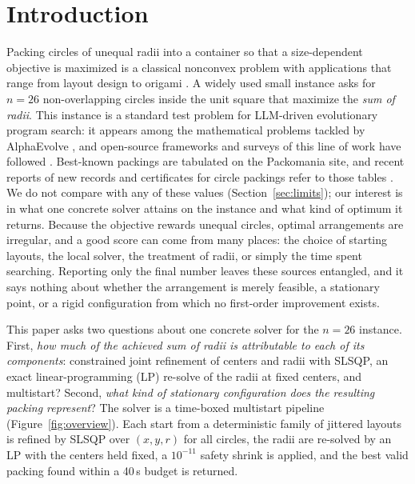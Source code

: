 \documentclass{article} %
\begin{document}
\section{Introduction}
Packing circles of unequal radii into a container so that a size-dependent objective is maximized is a classical nonconvex problem with applications that range from layout design to origami \citep{Hifi2009Literature,Demaine2010Circle}.
A widely used small instance asks for $n=26$ non-overlapping circles inside the unit square that maximize the \emph{sum of radii}.
This instance is a standard test problem for LLM-driven evolutionary program search: it appears among the mathematical problems tackled by AlphaEvolve \citep{Alexander2025AlphaEvolve}, and open-source frameworks and surveys of this line of work have followed \citep{Assumpo2026CodeEvolve,Mao2026Driven}.
Best-known packings are tabulated on the Packomania site, and recent reports of new records and certificates for circle packings refer to those tables \citep{Sander2026Guided,MokiJulio2026Moki,Preciado2026Certified}.
We do not compare with any of these values (Section~\ref{sec:limits}); our interest is in what one concrete solver attains on the instance and what kind of optimum it returns.
Because the objective rewards unequal circles, optimal arrangements are irregular, and a good score can come from many places: the choice of starting layouts, the local solver, the treatment of radii, or simply the time spent searching.
Reporting only the final number leaves these sources entangled, and it says nothing about whether the arrangement is merely feasible, a stationary point, or a rigid configuration from which no first-order improvement exists.

This paper asks two questions about one concrete solver for the $n=26$ instance.
First, \emph{how much of the achieved sum of radii is attributable to each of its components}: constrained joint refinement of centers and radii with SLSQP, an exact linear-programming (LP) re-solve of the radii at fixed centers, and multistart?
Second, \emph{what kind of stationary configuration does the resulting packing represent}?
The solver is a time-boxed multistart pipeline (Figure~\ref{fig:overview}).
Each start from a deterministic family of jittered layouts is refined by SLSQP over $(x,y,r)$ for all circles, the radii are re-solved by an LP with the centers held fixed, a $10^{-11}$ safety shrink is applied, and the best valid packing found within a 40\,s budget is returned.
\end{document}
